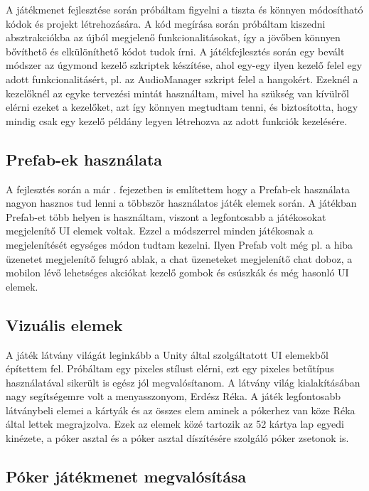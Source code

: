\documentclass[]{thesis-ekf}
\theoremstyle{definition}
\theoremstyle{remark}
\begin{document}
A játékmenet fejlesztése során próbáltam figyelni a tiszta és könnyen módosítható kódok és projekt létrehozására. A kód megírása során próbáltam kiszedni absztrakciókba az újból megjelenő funkcionalitásokat, így a jövőben könnyen bővíthető és elkülöníthető kódot tudok írni. A játékfejlesztés során egy bevált módszer az úgymond kezelő szkriptek készítése, ahol egy-egy ilyen kezelő felel egy adott funkcionalitásért, pl. az AudioManager szkript felel a hangokért. Ezeknél a kezelőknél az egyke tervezési mintát használtam, mivel ha szükség van kívülről elérni ezeket a kezelőket, azt így könnyen megtudtam tenni, és biztosította, hogy mindig csak egy kezelő példány legyen létrehozva az adott funkciók kezelésére.

\subsection{Prefab-ek használata}

A fejlesztés során a már . fejezetben is említettem hogy a Prefab-ek használata nagyon hasznos tud lenni a többször használatos játék elemek során. A játékban Prefab-et több helyen is használtam, viszont a legfontosabb a játékosokat megjelenítő UI elemek voltak. Ezzel a módszerrel minden játékosnak a megjelenítését egységes módon tudtam kezelni. Ilyen Prefab volt még pl. a hiba üzenetet megjelenítő felugró ablak, a chat üzeneteket megjelenítő chat doboz, a mobilon lévő lehetséges akciókat kezelő gombok és csúszkák és még hasonló UI elemek.

\subsection{Vizuális elemek}

A játék látvány világát leginkább a Unity által szolgáltatott UI elemekből építettem fel. Próbáltam egy pixeles stílust elérni, ezt egy pixeles betűtípus használatával sikerült is egész jól megvalósítanom. A látvány világ kialakításában nagy segítségemre volt a menyasszonyom, Erdész Réka. A játék legfontosabb látványbeli elemei a kártyák és az összes elem aminek a pókerhez van köze Réka által lettek megrajzolva. Ezek az elemek közé tartozik az 52 kártya lap egyedi kinézete, a póker asztal és a póker asztal díszítésére szolgáló póker zsetonok is.

\subsection{Póker játékmenet megvalósítása}
\end{document}
